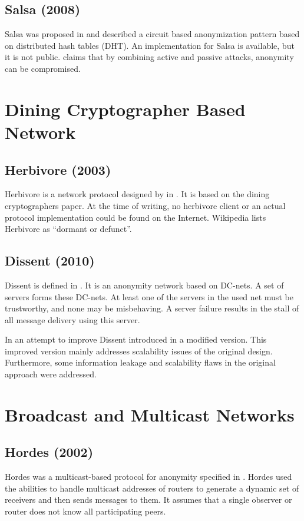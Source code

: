 \subsection{Salsa (2008)}
Salsa was proposed in \cite{Salsa} and described a circuit based anonymization pattern based on distributed hash tables (DHT). An implementation for Salsa is available, but it is not public. \cite{ccs2008:mittal} claims that by combining active and passive attacks, anonymity can be compromised.

\section{Dining Cryptographer Based Network}
\subsection{Herbivore (2003)}
Herbivore is a network protocol designed by \citeauthor{herbivore:tr} in \cite{herbivore:tr}. It is based on the dining cryptographers paper\cite{chaum-dc}. At the time of writing, no herbivore client or an actual protocol implementation could be found on the Internet. Wikipedia lists Herbivore as ``dormant or defunct''.

\subsection{Dissent (2010)}
Dissent is defined in \cite{Corrigan-Gibbs:2010:DAA:1866307.1866346}. It is an anonymity network based on DC-nets. A set of servers forms these DC-nets. At least one of the servers in the used net must be trustworthy, and none may be misbehaving. A server failure results in the stall of all message delivery using this server.

In an attempt to improve Dissent \citeauthor{wolinsky2012dissent} introduced in \cite{wolinsky2012dissent} a modified version. This improved version mainly addresses scalability issues of the original design. Furthermore, some information leakage and scalability flaws in the original approach were addressed.

\section{Broadcast and Multicast Networks}
\subsection{Hordes (2002)}
Hordes was a multicast-based protocol for anonymity specified in \cite{Levine:2002}. Hordes used the abilities to handle multicast addresses of routers to generate a dynamic set of receivers and then sends messages to them. It assumes that a single observer or router does not know all participating peers. 


